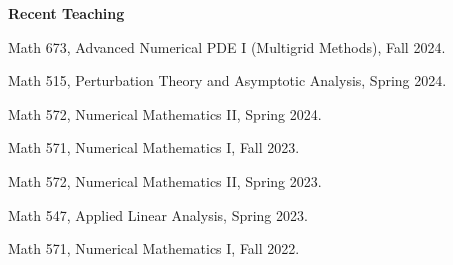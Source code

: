 \documentclass[11pt]{letter}
\begin{document}
	\smallskip
	
	{\LARGE\bf  Recent Teaching}
    \begin{description}
    \item
Math 673, Advanced Numerical PDE I (Multigrid Methods), Fall 2024.
    \item
Math 515, Perturbation Theory and Asymptotic Analysis, Spring 2024.
    \item
Math 572, Numerical Mathematics II, Spring 2024.
    \item
Math 571, Numerical Mathematics I, Fall 2023.
    \item
Math 572, Numerical Mathematics II, Spring 2023.
	\item
Math 547, Applied Linear Analysis, Spring 2023.
    \item
Math 571, Numerical Mathematics I, Fall 2022.
	\end{description}
\end{document}
